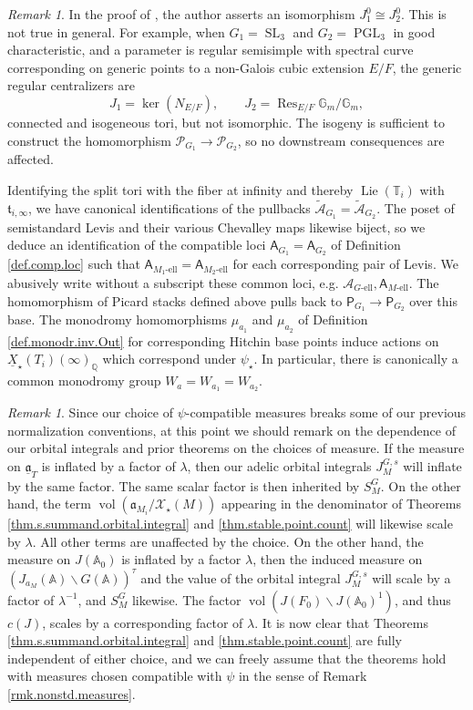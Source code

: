 \documentclass[openany]{amsbook}
\theoremstyle{definition}
\theoremstyle{remark}
\newtheorem{remark}[theorem]{Remark}
\numberwithin{equation}{section}
\newcommand{\Q}{\mathbb{Q}}
\newcommand{\G}{\mathbb{G}}
\newcommand{\T}{\mathbb{T}}
\newcommand{\cA}{\mathcal{A}}
\newcommand{\cX}{\mathcal{X}}
\newcommand{\cP}{\mathcal{P}}
\newcommand{\A}{\mathbb{A}}
\newcommand{\ul}[1]{\underline{#1}}
\newcommand{\vol}{\operatorname{vol}}
\renewcommand{\-}{\operatorname{-}}
\newcommand{\SL}{\operatorname{SL}}
\newcommand{\PGL}{\operatorname{PGL}}
\renewcommand{\a}{\mathfrak{a}}
\newcommand{\on}[1]{\operatorname{#1}}
\newcommand{\Res}{\on{Res}}
\renewcommand{\A}{\mathbb{A}}
\newcommand{\el}{\text{-ell}}
\newcommand{\ctA}{\widetilde{\cA}}
\newcommand{\bA}{\mathsf{A}}
\newcommand{\bP}{\mathsf{P}}
\newcommand{\ft}{\mathfrak{t}}
\newcommand{\Lie}{\on{Lie}}
\newcommand{\ga}{\ul{\a}}
\begin{document}
\begin{remark}
    In the proof of \cite[Proposition 4.18.1]{ngofl}, the author asserts an isomorphism $J_1^0 \cong J_2^0$. This is not true in general. For example, when $G_1 = \SL_3$ and $G_2 = \PGL_3$ in good characteristic, and a parameter is regular semisimple with spectral curve corresponding on generic points to a non-Galois cubic extension $E/F$, the generic regular centralizers are
    $$
        J_1 = \ker(N_{E/F}), \qquad J_2 = \Res_{E/F} \G_m/\G_m,
    $$
    connected and isogeneous tori, but not isomorphic. The isogeny is sufficient to construct the homomorphism $\cP_{G_1} \to \cP_{G_2}$, so no downstream consequences are affected.
\end{remark}

Identifying the split tori with the fiber at infinity and thereby $\Lie(\T_i)$ with $\ft_{i,\infty}$, we have canonical identifications of the pullbacks $\ctA_{G_1} = \ctA_{G_2}$. The poset of semistandard Levis and their various Chevalley maps likewise biject, so we deduce an identification of the compatible loci $\bA_{G_1} = \bA_{G_2}$ of Definition \ref{def.comp.loc} such that $\bA_{M_1\el} = \bA_{M_2\el}$ for each corresponding pair of Levis. We abusively write without a subscript these common loci, e.g. $\cA_{G\el}, \bA_{M\el}$. The homomorphism of Picard stacks defined above pulls back to $\bP_{G_1} \to \bP_{G_2}$ over this base. The monodromy homomorphisms $\mu_{a_1}$ and $\mu_{a_2}$ of Definition \ref{def.monodr.inv.Out} for corresponding Hitchin base points induce actions on $\ul{X}_\star(T_i)(\infty)_{\Q}$ which correspond under $\psi_\star$. In particular, there is canonically a common monodromy group $W_a = W_{a_1} = W_{a_2}$.

\begin{remark}\label{rmk.point.count.indep.of.meas.choice}
    Since our choice of $\psi$-compatible measures breaks some of our previous normalization conventions, at this point we should remark on the dependence of our orbital integrals and prior theorems on the choices of measure. If the measure on $\ga_T$ is inflated by a factor of $\lambda$, then our adelic orbital integrals $J_M^{G,s}$ will inflate by the same factor. 
    The same scalar factor is then inherited by $S_M^{G}$. On the other hand, the term $\vol(\a_{M_i}/\cX_\star(M))$ appearing in the denominator of Theorems \ref{thm.s.summand.orbital.integral} and \ref{thm.stable.point.count} will likewise scale by $\lambda$. All other terms are unaffected by the choice. On the other hand, the measure on $J(\A_0)$ is inflated by a factor $\lambda$, then the induced measure on $(J_{a_M}(\A) \backslash G(\A))^{\tau}$ and the value of the orbital integral $J_{M}^{G,s}$ will scale by a factor of $\lambda^{-1}$, and $S_{M}^{G}$ likewise. The factor $\vol(J(F_0) \backslash J(\A_0)^1)$, and thus $c(J)$, scales by a corresponding factor of $\lambda$. It is now clear that Theorems \ref{thm.s.summand.orbital.integral} and \ref{thm.stable.point.count} are fully independent of either choice, and we can freely assume that the theorems hold with measures chosen compatible with $\psi$ in the sense of Remark \ref{rmk.nonstd.measures}. 
\end{remark} 
\end{document}
